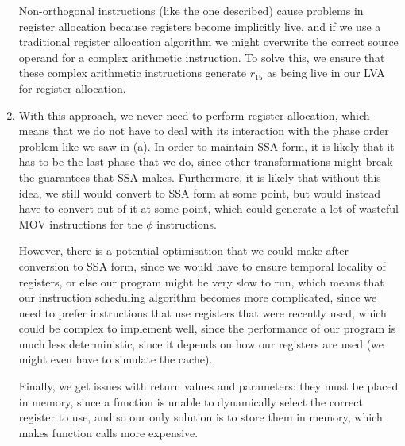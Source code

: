 \begin{enumerate}[label=(\alph*)]
  Non-orthogonal instructions (like the one described) cause problems in register allocation because registers become implicitly live, and if we use a traditional register allocation algorithm we might overwrite the correct source operand for a complex arithmetic instruction. To solve this, we ensure that these complex arithmetic instructions generate $r_{15}$ as being live in our LVA for register allocation.

  \item
    With this approach, we never need to perform register allocation, which means that we do not have to deal with its interaction with the phase order problem like we saw in (a). In order to maintain SSA form, it is likely that it has to be the last phase that we do, since other transformations might break the guarantees that SSA makes. Furthermore, it is likely that without this idea, we still would convert to SSA form at some point, but would instead have to convert out of it at some point, which could generate a lot of wasteful MOV instructions for the $\phi$ instructions.

    However, there is a potential optimisation that we could make after conversion to SSA form, since we would have to ensure temporal locality of registers, or else our program might be very slow to run, which means that our instruction scheduling algorithm becomes more complicated, since we need to prefer instructions that use registers that were recently used, which could be complex to implement well, since the performance of our program is much less deterministic, since it depends on how our registers are used (we might even have to simulate the cache).

    Finally, we get issues with return values and parameters: they must be placed in memory, since a function is unable to dynamically select the correct register to use, and so our only solution is to store them in memory, which makes function calls more expensive.


        
    \end{enumerate}

